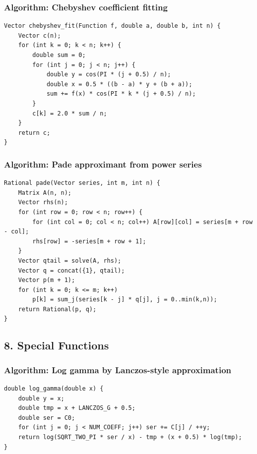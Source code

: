 \documentclass[11pt]{article}
\begin{document}
\subsubsection{Algorithm: Chebyshev coefficient fitting}\label{algorithm-chebyshev-coefficient-fitting}

\begin{verbatim}
Vector chebyshev_fit(Function f, double a, double b, int n) {
    Vector c(n);
    for (int k = 0; k < n; k++) {
        double sum = 0;
        for (int j = 0; j < n; j++) {
            double y = cos(PI * (j + 0.5) / n);
            double x = 0.5 * ((b - a) * y + (b + a));
            sum += f(x) * cos(PI * k * (j + 0.5) / n);
        }
        c[k] = 2.0 * sum / n;
    }
    return c;
}
\end{verbatim}

\subsubsection{Algorithm: Pade approximant from power series}\label{algorithm-pade-approximant-from-power-series}

\begin{verbatim}
Rational pade(Vector series, int m, int n) {
    Matrix A(n, n);
    Vector rhs(n);
    for (int row = 0; row < n; row++) {
        for (int col = 0; col < n; col++) A[row][col] = series[m + row - col];
        rhs[row] = -series[m + row + 1];
    }
    Vector qtail = solve(A, rhs);
    Vector q = concat({1}, qtail);
    Vector p(m + 1);
    for (int k = 0; k <= m; k++)
        p[k] = sum_j(series[k - j] * q[j], j = 0..min(k,n));
    return Rational(p, q);
}
\end{verbatim}

\subsection{8. Special Functions}\label{special-functions}

\subsubsection{Algorithm: Log gamma by Lanczos-style approximation}\label{algorithm-log-gamma-by-lanczos-style-approximation}

\begin{verbatim}
double log_gamma(double x) {
    double y = x;
    double tmp = x + LANCZOS_G + 0.5;
    double ser = C0;
    for (int j = 0; j < NUM_COEFF; j++) ser += C[j] / ++y;
    return log(SQRT_TWO_PI * ser / x) - tmp + (x + 0.5) * log(tmp);
}
\end{verbatim}
\end{document}
